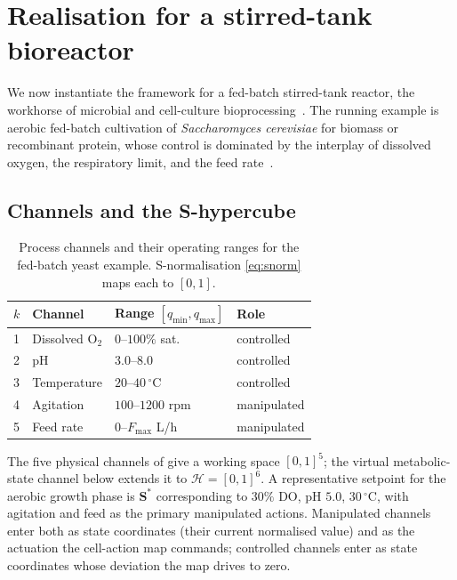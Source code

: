 \documentclass[11pt,a4paper,twocolumn]{article}
\theoremstyle{thmstyle}
\theoremstyle{definition}
\theoremstyle{remark}
\newcommand{\Hs}{\mathcal{H}}
\newcommand{\Ss}{\mathbf{S}}
\newcommand{\Sstar}{\Ss^{\ast}}
\begin{document}
\section{Realisation for a stirred-tank bioreactor}
\label{sec:bioreactor}

We now instantiate the framework for a fed-batch stirred-tank reactor, the
workhorse of microbial and cell-culture
bioprocessing~\citep{doran2013bioprocess,shuler2017bioprocess}. The
running example is aerobic fed-batch cultivation of
\textit{Saccharomyces cerevisiae} for biomass or recombinant protein,
whose control is dominated by the interplay of dissolved oxygen, the
respiratory limit, and the feed rate~\citep{sonnleitner1986growth,garciaortega2013fedbatch}.

\subsection{Channels and the S-hypercube}

\begin{table}[t]
\centering\small
\caption{Process channels and their operating ranges for the fed-batch
yeast example. S-normalisation \eqref{eq:snorm} maps each to $[0,1]$.}
\label{tab:channels}
\begin{tabular}{@{}llll@{}}
\toprule
$k$ & Channel & Range $[q_{\min},q_{\max}]$ & Role \\
\midrule
1 & Dissolved $\mathrm{O_2}$ & $0$--$100\%$ sat.\ & controlled \\
2 & pH & $3.0$--$8.0$ & controlled \\
3 & Temperature & $20$--$40\,^{\circ}$C & controlled \\
4 & Agitation & $100$--$1200$ rpm & manipulated \\
5 & Feed rate & $0$--$F_{\max}$ L/h & manipulated \\
\bottomrule
\end{tabular}
\end{table}

The five physical channels of  give a working space
$[0,1]^5$; the virtual metabolic-state channel below extends it to
$\Hs=[0,1]^6$. A representative setpoint for the aerobic growth phase is
$\Sstar$ corresponding to $30\%$ DO, pH $5.0$, $30\,^{\circ}$C, with
agitation and feed as the primary manipulated actions. Manipulated
channels enter both as state coordinates (their current normalised value)
and as the actuation the cell-action map commands; controlled channels
enter as state coordinates whose deviation the map drives to zero.
\end{document}
